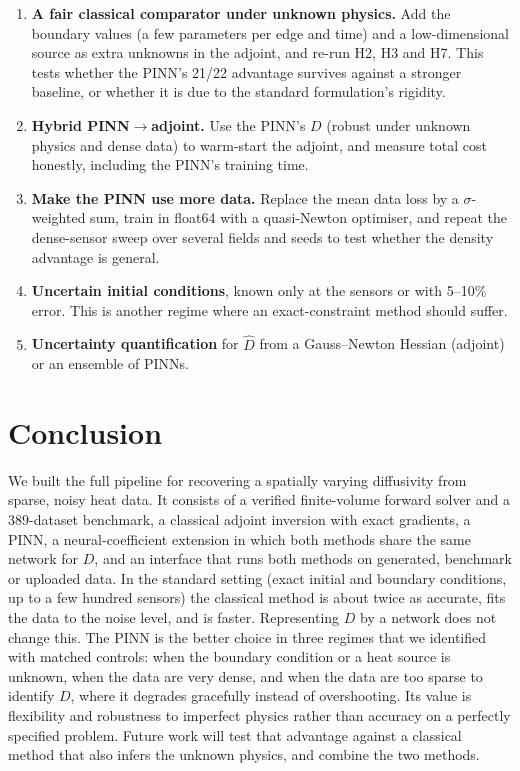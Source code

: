 \documentclass[twoside,english]{article}
\begin{document}
\begin{enumerate}
\item \textbf{A fair classical comparator under unknown physics.} Add the boundary values (a few parameters per edge and time) and a low-dimensional source as extra unknowns in the adjoint, and re-run H2, H3 and H7. This tests whether the PINN's 21/22 advantage survives against a stronger baseline, or whether it is due to the standard formulation's rigidity.
\item \textbf{Hybrid PINN$\rightarrow$adjoint.} Use the PINN's $D$ (robust under unknown physics and dense data) to warm-start the adjoint, and measure total cost honestly, including the PINN's training time.
\item \textbf{Make the PINN use more data.} Replace the mean data loss by a $\sigma$-weighted sum, train in float64 with a quasi-Newton optimiser, and repeat the dense-sensor sweep over several fields and seeds to test whether the density advantage is general.
\item \textbf{Uncertain initial conditions}, known only at the sensors or with 5--10\% error. This is another regime where an exact-constraint method should suffer.
\item \textbf{Uncertainty quantification} for $\hat D$ from a Gauss--Newton Hessian (adjoint) or an ensemble of PINNs.
\end{enumerate}

\section{Conclusion} \label{sec:conclusion}

We built the full pipeline for recovering a spatially varying diffusivity from sparse, noisy heat data. It consists of a verified finite-volume forward solver and a 389-dataset benchmark, a classical adjoint inversion with exact gradients, a PINN, a neural-coefficient extension in which both methods share the same network for $D$, and an interface that runs both methods on generated, benchmark or uploaded data. In the standard setting (exact initial and boundary conditions, up to a few hundred sensors) the classical method is about twice as accurate, fits the data to the noise level, and is faster. Representing $D$ by a network does not change this. The PINN is the better choice in three regimes that we identified with matched controls: when the boundary condition or a heat source is unknown, when the data are very dense, and when the data are too sparse to identify $D$, where it degrades gracefully instead of overshooting. Its value is flexibility and robustness to imperfect physics rather than accuracy on a perfectly specified problem. Future work will test that advantage against a classical method that also infers the unknown physics, and combine the two methods.



\end{document}
